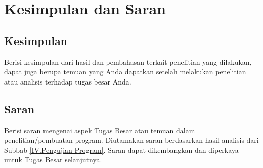 \newpage
\chapter{Kesimpulan dan Saran} \label{Bab V}

\section{Kesimpulan} \label{V.Kesimpulan}
Berisi kesimpulan dari hasil dan pembahasan terkait penelitian yang dilakukan, dapat juga berupa temuan yang Anda dapatkan setelah melakukan penelitian atau analisis terhadap tugas besar Anda.

\section{Saran} \label{V.Saran}
Berisi saran mengenai aspek Tugas Besar atau temuan dalam penelitian/pembuatan program. Diutamakan saran berdasarkan hasil analisis dari Subbab \ref{IV.Pengujian Program}. Saran dapat dikembangkan dan diperkaya untuk Tugas Besar selanjutnya. 